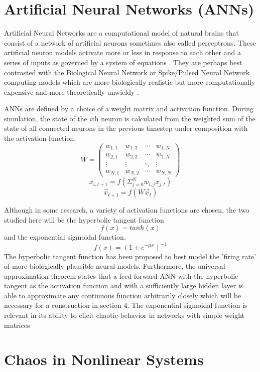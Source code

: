 \documentclass[12pt]{article}
\begin{document}
\section{Artificial Neural Networks (ANNs)}
Artificial Neural Networks are a computational model of natural brains that
consist of a network of artificial neurons sometimes also called perceptrons.
These artificial neuron models activate more or less in response to
each other and a series of inputs as governed by a system of
equations \cite{jaeger_original, doya, dayan}.  They are perhaps best
contrasted with the Biological Neural Network or Spike/Pulsed Neural
Network computing models
which are more biologically realistic but more computationally expensive and
more theoretically unwieldy \cite{maass_book, fitzhugh, izhikevich_book}.

ANNs are defined by a choice of a weight matrix and activation function.
During simulation, the state of the $i$th neuron is calculated from the
weighted sum
of the state of all connected neurons in the previous timestep under
composition with the activation function.
\[ W= \left( \begin{array}{cccc}
             w_{1,1} & w_{1,2} & \cdots & w_{1,N} \\
                  w_{2,1} & w_{2,2} & \cdots & w_{2,N} \\
                       \vdots  & \vdots  & \ddots & \vdots \\
                            w_{N,1} & w_{N,2} & \cdots & w_{N,N} \end{array} \right)\]
$$x_{i,t+1} = f(\Sigma_{j=0}^{N} w_{i,j}x_{j,t})$$
$$\vec{x}_{t+1} = f(W \vec{x}_{t})$$


Although in some research, a variety of activation functions are chosen,
the two studied here will be
the hyperbolic tangent function
$$f(x) = tanh(x)$$
and the exponential sigmoidal function.
$$f(x) = (1 + e^{-\mu x})^{-1}$$
The hyperbolic tangent function has been proposed to best model the
'firing rate'
of more biologically plausible neural models.  Furthermore, the
universal approximation theorem states that a feed-forward ANN with the
hyperbolic tangent as the activation function and with a
sufficiently large hidden layer is able to approximate any continuous function
arbitrarily closely \cite{universal} which will be necessary for a
construction in section 4.  The exponential sigmoidal function is
relevant in its ability to elicit chaotic behavior in networks with simple
weight matrices

\section{Chaos in Nonlinear Systems}
\end{document}
